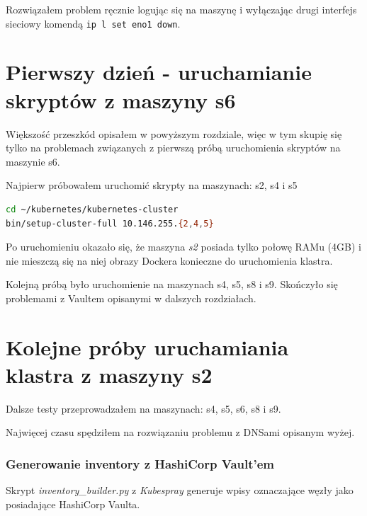 \documentclass[a4paper,12pt,twoside,openany]{report}
\newcommand{\passthrough}[1]{#1}
\begin{document}
Rozwiązałem problem ręcznie logując się na maszynę i wyłączając drugi
interfejs sieciowy komendą \passthrough{\lstinline!ip l set eno1 down!}.

\hypertarget{pierwszy-dzieux144---uruchamianie-skryptuxf3w-z-maszyny-s6}{%
\section{Pierwszy dzień - uruchamianie skryptów z maszyny
s6}\label{pierwszy-dzieux144---uruchamianie-skryptuxf3w-z-maszyny-s6}}

Większość przeszkód opisałem w powyższym rozdziale, więc w tym skupię
się tylko na problemach związanych z pierwszą próbą uruchomienia
skryptów na maszynie s6.

Najpierw próbowałem uruchomić skrypty na maszynach: s2, s4 i s5

\begin{lstlisting}[language=bash]
cd ~/kubernetes/kubernetes-cluster
bin/setup-cluster-full 10.146.255.{2,4,5}
\end{lstlisting}

Po uruchomieniu okazało się, że maszyna \emph{s2} posiada tylko połowę
RAMu (4GB) i nie mieszczą się na niej obrazy Dockera konieczne do
uruchomienia klastra.

Kolejną próbą było uruchomienie na maszynach s4, s5, s8 i s9. Skończyło
się problemami z Vaultem opisanymi w dalszych rozdziałach.

\hypertarget{kolejne-pruxf3by-uruchamiania-klastra-z-maszyny-s2}{%
\section{Kolejne próby uruchamiania klastra z maszyny
s2}\label{kolejne-pruxf3by-uruchamiania-klastra-z-maszyny-s2}}

Dalsze testy przeprowadzałem na maszynach: s4, s5, s6, s8 i s9.

Najwięcej czasu spędziłem na rozwiązaniu problemu z DNSami opisanym
wyżej.

\hypertarget{generowanie-inventory-z-hashicorp-vaultem}{%
\subsubsection{Generowanie inventory z HashiCorp
Vault'em}\label{generowanie-inventory-z-hashicorp-vaultem}}

Skrypt \emph{inventory\_builder.py} z \emph{Kubespray} generuje wpisy
oznaczające węzły jako posiadające HashiCorp Vaulta.
\end{document}
